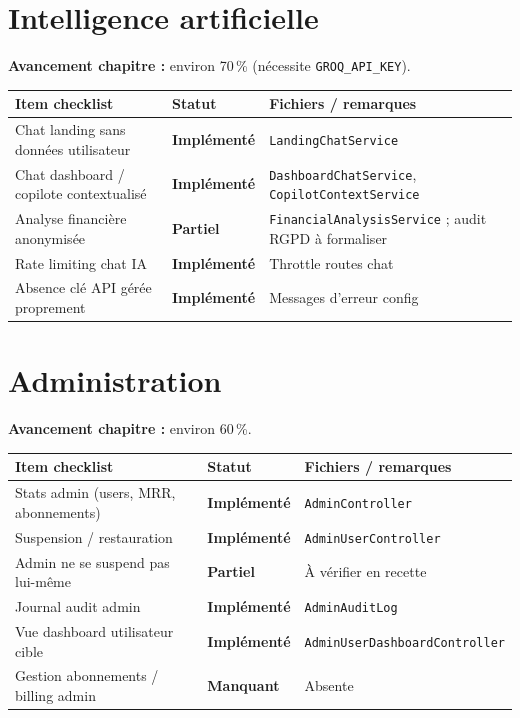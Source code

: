 \documentclass[11pt,a4paper]{report}
\newcommand{\ctrl}[1]{\texttt{\small #1}}
\newcommand{\svc}[1]{\texttt{\small #1}}
\newcommand{\model}[1]{\texttt{\small #1}}
\newcommand{\statimpl}{\textcolor{statok}{\textbf{Implémenté}}}
\newcommand{\statpart}{\textcolor{statpartial}{\textbf{Partiel}}}
\newcommand{\statmiss}{\textcolor{statno}{\textbf{Manquant}}}
\begin{document}
\chapter{Intelligence artificielle}

\textbf{Avancement chapitre :} environ 70\,\% (nécessite \texttt{GROQ\_API\_KEY}).

\begin{longtable}{@{}L{7.8cm}C{2.4cm}L{4.4cm}@{}}
    \toprule
    \textbf{Item checklist} & \textbf{Statut} & \textbf{Fichiers / remarques} \\
    \midrule
    \endhead
    Chat landing sans données utilisateur & \statimpl & \svc{LandingChatService} \\
    Chat dashboard / copilote contextualisé & \statimpl & \svc{DashboardChatService}, \svc{CopilotContextService} \\
    Analyse financière anonymisée & \statpart & \svc{FinancialAnalysisService} ; audit RGPD à formaliser \\
    Rate limiting chat IA & \statimpl & Throttle routes chat \\
    Absence clé API gérée proprement & \statimpl & Messages d'erreur config \\
    \bottomrule
\end{longtable}

\chapter{Administration}

\textbf{Avancement chapitre :} environ 60\,\%.

\begin{longtable}{@{}L{7.8cm}C{2.4cm}L{4.4cm}@{}}
    \toprule
    \textbf{Item checklist} & \textbf{Statut} & \textbf{Fichiers / remarques} \\
    \midrule
    \endhead
    Stats admin (users, MRR, abonnements) & \statimpl & \ctrl{AdminController} \\
    Suspension / restauration & \statimpl & \ctrl{AdminUserController} \\
    Admin ne se suspend pas lui-même & \statpart & À vérifier en recette \\
    Journal audit admin & \statimpl & \model{AdminAuditLog} \\
    Vue dashboard utilisateur cible & \statimpl & \ctrl{AdminUserDashboardController} \\
    Gestion abonnements / billing admin & \statmiss & Absente \\
    \bottomrule
\end{longtable}
\end{document}
